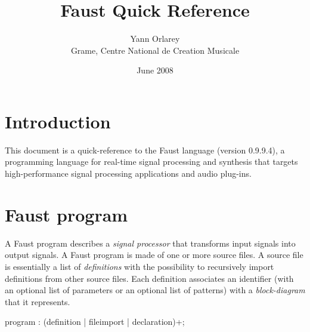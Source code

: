 \documentclass{article}
\begin{document}
\title{Faust Quick Reference}
\author{Yann Orlarey\\Grame, Centre National de Creation Musicale}
\date{June 2008}



\newcommand{\farg}[1]{\textrm{\textit{#1}}}
\newcommand{\ldbrack}{[\![ \,}
\newcommand{\rdbrack}{\, ]\!] }
\newcommand{\rdbrackC}{\rdbrack_{\mathrm{C}}\,}
\newcommand{\dbrack}[1]{\ldbrack #1 \rdbrack}
\newcommand{\semantic}[1]{\ldbrack #1 \rdbrack}
\newcommand{\dbrackC}[1]{\ldbrack #1 \rdbrackC}

\setlength{\parindent}{0pt}
\setlength{\parskip}{1ex plus 0.5ex minus 0.2ex}

\maketitle

\section{Introduction}

This document is a quick-reference to the Faust language (version 0.9.9.4), a programming language for real-time signal processing and synthesis that targets high-performance signal processing applications and audio plug-ins.

\section{Faust program}


A Faust program describes a \emph{signal processor} that transforms input signals into output signals. A Faust program is made of one or more source files. A source file is essentially a list of \emph{definitions} with the possibility to recursively import definitions from other source files. Each definition associates an identifier (with an optional list of parameters or an optional list of patterns) with a \emph{block-diagram} that it represents.

\begin{rail}
program : (definition | fileimport | declaration)+;
\end{rail}
\end{document}
